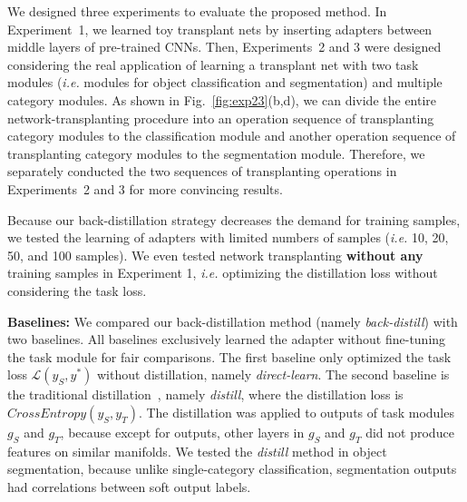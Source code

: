 \documentclass[10pt,twocolumn,letterpaper]{article}
\begin{document}
We designed three experiments to evaluate the proposed method. In Experiment~1, we learned toy transplant nets by inserting adapters between middle layers of pre-trained CNNs. Then, Experiments~2 and 3 were designed considering the real application of learning a transplant net with two task modules (\emph{i.e.} modules for object classification and segmentation) and multiple category modules. As shown in Fig.~\ref{fig:exp23}(b,d), we can divide the entire network-transplanting procedure into an operation sequence of transplanting category modules to the classification module and another operation sequence of transplanting category modules to the segmentation module. Therefore, we separately conducted the two sequences of transplanting operations in Experiments~2 and 3 for more convincing results.

Because our back-distillation strategy decreases the demand for training samples, we tested the learning of adapters with limited numbers of samples (\emph{i.e.} 10, 20, 50, and 100 samples). We even tested network transplanting \textbf{without any} training samples in Experiment 1, \emph{i.e.} optimizing the distillation loss without considering the task loss.



\textbf{Baselines:} We compared our back-distillation method (namely \textit{back-distill}) with two baselines. All baselines exclusively learned the adapter without fine-tuning the task module for fair comparisons. The first baseline only optimized the task loss {\small$\mathcal{L}(y_{S},y^{*})$} without distillation, namely \textit{direct-learn}. The second baseline is the traditional distillation~\cite{distill}, namely \textit{distill}, where the distillation loss is {\small$CrossEntropy(y_{S},y_{T})$}. The distillation was applied to outputs of task modules {\small$g_{S}$} and {\small$g_{T}$}, because except for outputs, other layers in {\small$g_{S}$} and {\small$g_{T}$} did not produce features on similar manifolds. We tested the \textit{distill} method in object segmentation, because unlike single-category classification, segmentation outputs had correlations between soft output labels.
\end{document}

